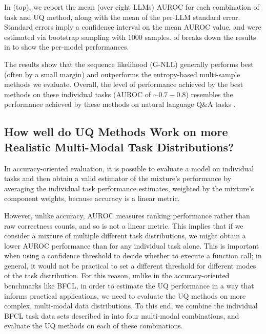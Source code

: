 In  (top), we report the mean (over eight LLMs) AUROC for each combination of task and UQ method, along with the mean of the per-LLM standard error.
Standard errors imply a confidence interval on the mean AUROC value, and were estimated via bootstrap sampling with 1000 samples.
 of  breaks down the results in  to show the per-model performances.

The results show that the sequence likelihood (G-NLL) %
generally performs best (often by a small margin)
and outperforms the entropy-based multi-sample methods we evaluate.
Overall, the level of performance achieved by the best methods on these individual tasks (AUROC of $\sim 0.7-0.8$) resembles the performance achieved by these methods on natural language Q\&A tasks \citep{aichberger2024rethi,farquhar2024detec}.





\subsection{How well do UQ Methods Work on more 
Realistic Multi-Modal Task Distributions? }
\label{sec:combinations}
In accuracy-oriented evaluation, it is possible to evaluate a model on individual tasks and then obtain a valid estimator of the mixture's performance by averaging the individual task performance estimates, weighted by the mixture's component weights, because accuracy is a linear metric.

However, unlike accuracy, AUROC measures ranking performance rather than raw correctness counts, and so is not a linear metric.
This implies that if we consider a mixture of multiple different task distributions, we might obtain a lower AUROC performance than for any individual task alone. This is important when using a confidence threshold to decide whether to execute a function call; in general, it would not be practical to set a different threshold for different modes of the task distribution.
For this reason, unlike in the accuracy-oriented benchmarks like BFCL, in order to estimate the UQ performance in a way that informs practical applications, we need to evaluate the UQ methods on more complex, multi-modal data distributions.
To this end, we combine the individual BFCL task data sets described in  into four multi-modal combinations, and evaluate the UQ methods on each of these combinations.

